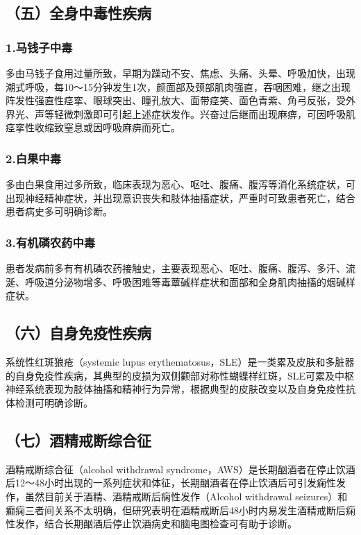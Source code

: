 \subsection{（五）全身中毒性疾病}

\subsubsection{1.马钱子中毒}

多由马钱子食用过量所致，早期为躁动不安、焦虑、头痛、头晕、呼吸加快，出现潮式呼吸，每10～15分钟发生1次，颜面部及颈部肌肉强直，吞咽困难，继之出现阵发性强直性痉挛、眼球突出、瞳孔放大、面带痉笑、面色青紫、角弓反张，受外界光、声等轻微刺激即可引起上述症状发作。兴奋过后继而出现麻痹，可因呼吸肌痉挛性收缩致窒息或因呼吸麻痹而死亡。

\subsubsection{2.白果中毒}

多由白果食用过多所致，临床表现为恶心、呕吐、腹痛、腹泻等消化系统症状，可出现神经精神症状，并出现意识丧失和肢体抽搐症状，严重时可致患者死亡，结合患者病史多可明确诊断。

\subsubsection{3.有机磷农药中毒}

患者发病前多有有机磷农药接触史，主要表现恶心、呕吐、腹痛、腹泻、多汗、流涎、呼吸道分泌物增多、呼吸困难等毒蕈碱样症状和面部和全身肌肉抽搐的烟碱样症状。

\subsection{（六）自身免疫性疾病}

系统性红斑狼疮（systemic lupus
erythematosus，SLE）是一类累及皮肤和多脏器的自身免疫性疾病，其典型的皮损为双侧颧部对称性蝴蝶样红斑，SLE可累及中枢神经系统表现为肢体抽搐和精神行为异常，根据典型的皮肤改变以及自身免疫性抗体检测可明确诊断。

\subsection{（七）酒精戒断综合征}

酒精戒断综合征（alcohol withdrawal
syndrome，AWS）是长期酗酒者在停止饮酒后12～48小时出现的一系列症状和体征，长期酗酒者在停止饮酒后可引发痫性发作，虽然目前关于酒精、酒精戒断后痫性发作（Alcohol
withdrawal
seizures）和癫痫三者间关系不太明确，但研究表明在酒精戒断后48小时内易发生酒精戒断后痫性发作，结合长期酗酒后停止饮酒病史和脑电图检查可有助于诊断。

